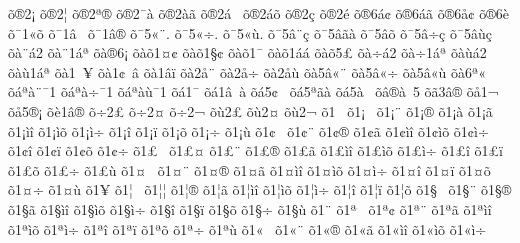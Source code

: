 {^^f5^^ae2^^a1
^^f5^^ae2^^a6
^^f5^^ae2^^aa^^ae^^ad
^^f5^^ae2^^af^^e0
^^f5^^ae2^^e0^^e3
^^f5^^ae2^^e1^^a0
^^f5^^ae2^^e1^^f5
^^f5^^ae2^^e7
^^f5^^ae2^^e9
^^f5^^ae6^^e1^^a2
^^f5^^ae6^^e1^^e3
^^f5^^ae6^^e5^^a2
^^f5^^ae6^^e8
^^f5^^af1^^ab^^f5
^^f5^^af1^^e2^^a0
^^f5^^af1^^e2^^ae
^^f5^^af5^^ab^^a8.
^^f5^^af5^^ab^^f7.
^^f5^^af5^^ab^^f9.
^^f5^^af5^^e2^^a8^^e7
^^f5^^af5^^e2^^e3^^e0
^^f5^^af5^^e2^^f5
^^f5^^af5^^e2^^f7^^e7
^^f5^^af5^^e2^^f9^^e7
^^f5^^e0^^a8^^e12
^^f5^^e0^^a81^^e1^^aa
^^f5^^e0^^ae6^^a1
^^f5^^e0^^f51^^a4^^a2
^^f5^^e0^^f51^^a7^^a2
^^f5^^e0^^f51^^af
^^f5^^e0^^f51^^e1^^e1
^^f5^^e0^^f55^^a3^^ad
^^f5^^e0^^f7^^e12
^^f5^^e0^^f71^^e1^^aa
^^f5^^e0^^f9^^e12
^^f5^^e0^^f91^^e1^^aa
^^f5^^e01^^a0^^a5
^^f5^^e01^^a2^^a0^^e2
^^f5^^e01^^e2^^ef
^^f5^^e02^^e5^^a8
^^f5^^e02^^e5^^f7
^^f5^^e02^^e5^^f9
^^f5^^e05^^e2^^ab^^a8
^^f5^^e05^^e2^^ab^^f7
^^f5^^e05^^e2^^ab^^f9
^^f5^^e06^^aa^^ab
^^f5^^e1^^aa^^e0^^a8^^af1
^^f5^^e1^^aa^^e0^^f7^^af1
^^f5^^e1^^aa^^e0^^f9^^af1
^^f5^^e11^^af
^^f5^^e11^^e2^^a0^^e0
^^f5^^e15^^a2^^a0
^^f5^^e15^^aa^^e3^^e0
^^f5^^e15^^e0^^a0
^^f5^^e2^^ae^^e0^^a05
^^f5^^e33^^e2^^ae
^^f5^^e51^^ac
^^f5^^e55^^ae^^a1
^^f5^^e81^^e2^^ae
^^f5^^f72^^a3
^^f5^^f72^^a4
^^f5^^f72^^ac
^^f5^^f92^^a3
^^f5^^f92^^a4
^^f5^^f92^^ac
^^f51^^a0
^^f51^^a1^^a0
^^f51^^a1^^a8
^^f51^^a1^^ae
^^f51^^a1^^e0
^^f51^^a1^^e3
^^f51^^a1^^ec^^ee
^^f51^^a1^^ec^^f5
^^f51^^a1^^ec^^f7
^^f51^^a1^^ee
^^f51^^a1^^ef
^^f51^^a1^^f5
^^f51^^a1^^f7
^^f51^^a1^^f9
^^f51^^a2^^a0
^^f51^^a2^^a8
^^f51^^a2^^ae
^^f51^^a2^^e3
^^f51^^a2^^ec^^ee
^^f51^^a2^^ec^^f5
^^f51^^a2^^ec^^f7
^^f51^^a2^^ee
^^f51^^a2^^ef
^^f51^^a2^^f5
^^f51^^a2^^f7
^^f51^^a3^^a0
^^f51^^a3^^a4
^^f51^^a3^^a8
^^f51^^a3^^ae
^^f51^^a3^^e3
^^f51^^a3^^ec^^ee
^^f51^^a3^^ec^^f5
^^f51^^a3^^ec^^f7
^^f51^^a3^^ee
^^f51^^a3^^ef
^^f51^^a3^^f5
^^f51^^a3^^f7
^^f51^^a3^^f9
^^f51^^a4^^a0
^^f51^^a4^^a8
^^f51^^a4^^ae
^^f51^^a4^^e3
^^f51^^a4^^ec^^ee
^^f51^^a4^^ec^^f5
^^f51^^a4^^ec^^f7
^^f51^^a4^^ee
^^f51^^a4^^ef
^^f51^^a4^^f5
^^f51^^a4^^f7
^^f51^^a4^^f9
^^f51^^a5
^^f51^^a6^^a0
^^f51^^a6^^a6
^^f51^^a6^^ae
^^f51^^a6^^e3
^^f51^^a6^^ec^^ee
^^f51^^a6^^ec^^f5
^^f51^^a6^^ec^^f7
^^f51^^a6^^ee
^^f51^^a6^^ef
^^f51^^a6^^f5
^^f51^^a7^^a0
^^f51^^a7^^a8
^^f51^^a7^^ae
^^f51^^a7^^e3
^^f51^^a7^^ec^^ee
^^f51^^a7^^ec^^f5
^^f51^^a7^^ec^^f7
^^f51^^a7^^ee
^^f51^^a7^^ef
^^f51^^a7^^f5
^^f51^^a7^^f7
^^f51^^a7^^f9
^^f51^^a8
^^f51^^aa^^a0
^^f51^^aa^^a2
^^f51^^aa^^a8
^^f51^^aa^^e3
^^f51^^aa^^ec^^ee
^^f51^^aa^^ec^^f5
^^f51^^aa^^ec^^f7
^^f51^^aa^^ee
^^f51^^aa^^ef
^^f51^^aa^^f5
^^f51^^aa^^f7
^^f51^^aa^^f9
^^f51^^ab^^a0
^^f51^^ab^^a8
^^f51^^ab^^ae
^^f51^^ab^^e3
^^f51^^ab^^ec^^ee
^^f51^^ab^^ec^^f5
^^f51^^ab^^ec^^f7
}
